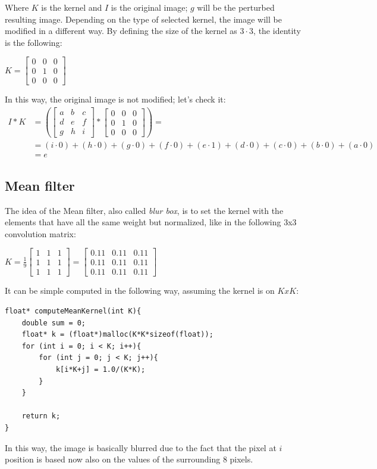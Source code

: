 \documentclass[paper=a4, fontsize=10pt]{scrartcl}	%
\begin{document}
	Where $K$ is the kernel and $I$ is the original image; $g$ will be the perturbed resulting image. Depending on the type of selected kernel, the image will be modified in a different way. By defining the size of the kernel as $3\cdot 3$, the identity is the following:
	\begin{center}
		$
		K = \begin{bmatrix}
			0 & 0 & 0\\
			0 & 1 & 0\\
			0 & 0 & 0
		\end{bmatrix}
		$
	\end{center}
	In this way, the original image is not modified; let's check it:
	\begin{align*}
		 I * K & =\left({\begin{bmatrix}a&b&c\\d&e&f\\g&h&i\end{bmatrix}}*{\begin{bmatrix}0&0&0\\0&1&0\\0&0&0\end{bmatrix}}\right) = \\
			&=(i\cdot 0)+(h\cdot 0)+(g\cdot 0)+(f\cdot 0)+(e\cdot 1)+(d\cdot 0)+(c\cdot 0)+(b\cdot 0)+(a\cdot 0)\\
			&= e
	\end{align*}

	
	\subsection{Mean filter}
	The idea of the Mean filter, also called \textit{blur box}, is to set the kernel with the elements that have all the same weight but normalized, like in the following 3x3 convolution matrix:
	\begin{center}
		$
		K = \frac{1}{9}\begin{bmatrix}
			1 & 1 & 1\\
			1 & 1 & 1\\
			1 & 1 & 1
		\end{bmatrix} = \begin{bmatrix}
		0.11 & 0.11 & 0.11\\
		0.11 & 0.11 & 0.11\\
		0.11 & 0.11 & 0.11
	\end{bmatrix}
		$
	\end{center}
	It can be simple computed in the following way, assuming the kernel is on $KxK$:
	\begin{lstlisting}[style=CStyle]
float* computeMeanKernel(int K){
	double sum = 0;
	float* k = (float*)malloc(K*K*sizeof(float));
	for (int i = 0; i < K; i++){
		for (int j = 0; j < K; j++){
			k[i*K+j] = 1.0/(K*K);
		}
	}
	
	return k;
}\end{lstlisting}	
	In this way, the image is basically blurred due to the fact that the pixel at $i$ position is based now also on the values of the surrounding 8 pixels.
\end{document}
